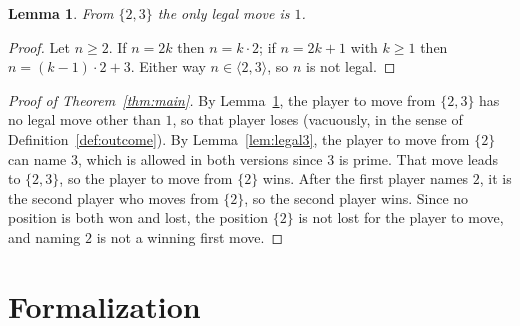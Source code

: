 \documentclass[11pt]{article}
\theoremstyle{plain}
\newtheorem{lemma}[theorem]{Lemma}
\theoremstyle{definition}
\theoremstyle{remark}
\begin{document}
\begin{lemma}\label{lem:only1}
From $\{2,3\}$ the only legal move is $1$.
\end{lemma}

\begin{proof}
Let $n\ge2$. If $n=2k$ then $n=k\cdot2$; if $n=2k+1$ with $k\ge1$ then
$n=(k-1)\cdot2+3$. Either way $n\in\langle2,3\rangle$, so $n$ is not legal.
\end{proof}

\begin{proof}[Proof of Theorem~\ref{thm:main}]
By Lemma~\ref{lem:only1}, the player to move from $\{2,3\}$ has no legal move other
than $1$, so that player loses (vacuously, in the sense of
Definition~\ref{def:outcome}). By Lemma~\ref{lem:legal3}, the player to move from
$\{2\}$ can name $3$, which is allowed in both versions since $3$ is prime. That move
leads to $\{2,3\}$, so the player to move from $\{2\}$ wins. After the first player
names $2$, it is the second player who moves from $\{2\}$, so the second player wins.
Since no position is both won and lost, the position $\{2\}$ is not lost for the player
to move, and naming $2$ is not a winning first move.
\end{proof}

\section{Formalization}
\end{document}
